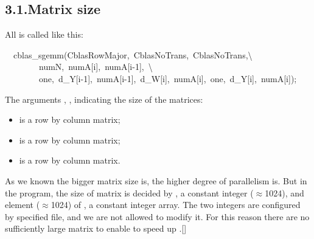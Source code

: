 \documentclass{article}
\begin{document}
\subsection{3.1.\hspace*{0.5em}Matrix size}\label{sec-matrix-size}%

\noindent{}All  is called like this:%
\begin{mdpre}%
\noindent~~cblas\_sgemm({CblasRowMajor},~{CblasNoTrans},~{CblasNoTrans},\textbackslash{}\\
~~~~~~~~numN,~numA[i],~numA[i-{1}],~\textbackslash{}\\
~~~~~~~~one,~d\_Y[i-{1}],~numA[i-{1}],~d\_W[i],~numA[i],~one,~d\_Y[i],~numA[i]);%
\end{mdpre}\noindent{}The arguments , ,  indicating the size of the matrices:

\begin{itemize}[noitemsep,topsep=\mdcompacttopsep]%

\item{} is a  row by  column matrix;%

\item{} is a  row by  column matrix;%

\item{} is a  row by  column matrix.%
\end{itemize}%

\noindent{}As we known the bigger matrix size is, the higher degree of  parallelism is. But in the  program, the size of matrix is decided by , a constant integer (\ensuremath{\approx}1024), and element (\ensuremath{\approx}1024) of , a constant integer array. The two integers are configured by specified file, and we are not allowed to modify it. For this reason there are no sufficiently large matrix to enable  to speed up .[]%
\end{document}

